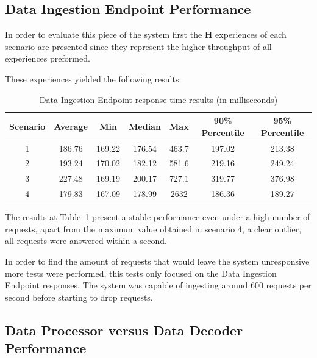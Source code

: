 \subsection{Data Ingestion Endpoint Performance}
\label{subsec:evaluation:overview:endpoint}

In order to evaluate this piece of the system first the \textbf{H} experiences of each scenario are presented since they represent the higher throughput of all experiences preformed.

These experiences yielded the following results:

\begin{table}[H]
    \caption{Data Ingestion Endpoint response time results (in milliseconds)}
    \label{tab:evaluation:overview:endpoint:results}
    \centering
    \begin{tabular}{@{}ccccccc@{}}
    \toprule
    \textbf{Scenario} & \textbf{Average} & \textbf{Min} & \textbf{Median} & \textbf{Max} & \textbf{90\% Percentile} & \textbf{95\% Percentile} \\ \midrule
    1 & 186.76 & 169.22 & 176.54 & 463.7 & 197.02 & 213.38 \\ \midrule
    2 & 193.24 & 170.02 & 182.12 & 581.6 & 219.16 & 249.24 \\ \midrule
    3 & 227.48 & 169.19 & 200.17 & 727.1 & 319.77 & 376.98 \\ \midrule
    4 & 179.83 & 167.09 & 178.99 & 2632 & 186.36 & 189.27 \\ \bottomrule
    \end{tabular}
\end{table}

The results at Table~\ref{tab:evaluation:overview:endpoint:results} present a stable performance even under a high number of requests, apart from the maximum value obtained in scenario 4, a clear outlier, all requests were answered within a second.

In order to find the amount of requests that would leave the system unresponsive more tests were performed, this tests only focused on the Data Ingestion Endpoint responses. The system was capable of ingesting around 600 requests per second before starting to drop requests.

\subsection{Data Processor versus Data Decoder Performance}
\label{subsec:evaluation:overview:decoproc}


